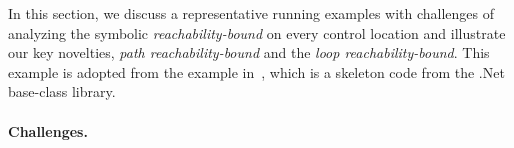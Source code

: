 In this section, we discuss a representative running examples with
challenges of analyzing the symbolic
\emph{reachability-bound} on
every control location and illustrate our key novelties, \emph{path reachability-bound} and the \emph{loop reachability-bound}.
This example is adopted from the example in~\cite{GulwaniZ10}, which
is a skeleton code from the .Net base-class library.

\paragraph{Challenges.}


